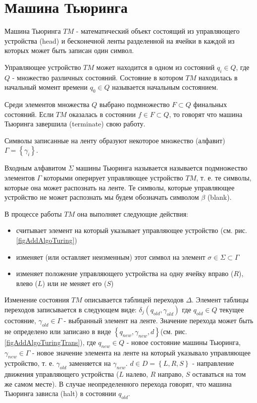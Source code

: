\section{Машина Тьюринга}
\label{addTuring}

Машина Тьюринга $TM$ - математический объект состоящий из
управляющего устройства (head) и бесконечной ленты разделенной на
ячейки в каждой из которых может быть записан один символ.



Управляющее устройство $TM$ может находится в одном из состояний $q_i
\in Q$, где $Q$ 
- множество различных состояний. Состояние в котором $TM$ находилась в
начальный момент времени $q_0 \in Q$ называется начальным состоянием. 

Среди элементов множества $Q$ выбрано подмножество $F \subset Q$
финальных состояний. Если $TM$ оказалась в состоянии $f \in F \subset
Q$, то говорят что машина Тьюринга завершила (terminate) свою работу.

Символы записанные на ленту образуют некоторое множество (алфавит)
$\Gamma = \left\{\gamma_i\right\}$.

Входным алфавитом $\Sigma$ машины Тьюринга называется называется
подмножество элементов $\Gamma$ которыми оперирует управляющее устройство $TM$,
т. е. те символы, которые она может распознать на ленте. Те символы,
которые управляющее устройство не может распознать мы будем обозначать символом
$\beta$ (blank).

В процессе работы $TM$ она выполняет следующие действия:
\begin{itemize}
\item{считывает элемент на который указывает управляющее устройство
  (см. рис. \ref{figAddAlgoTuring})}
\item{изменяет (или оставляет неизменным) этот символ на элемент
  $\sigma \in \Sigma \subset \Gamma$}
\item{изменяет положение управляющего устройства на одну ячейку вправо
  ($R$), влево ($L$) или не меняет его ($S$)}
\end{itemize}



Изменение состояния $TM$ описывается таблицей переходов
$\Delta$. Элемент таблицы переходов записывается в следующем виде: 
$\delta_j\left(q_{old}, \gamma_{old}\right)$ где $q_{old} \in Q$ текущее состояние,
$\gamma_{old} \in \Gamma$ - выбранный элемент на ленте. Значение
перехода может быть 
не определено или записано в виде $\left\{q_{new}, \gamma_{new},
d\right\}$(см. рис. \ref{figAddAlgoTuringTrans}), где
$q_{new} \in Q$ - новое состояние машины Тьюринга, $\gamma_{new} \in \Gamma$ -
новое значение элемента на ленте на который указывало управляющее устройство,
т. е. $\gamma_{old}$ заменяется на $\gamma_{new}$. $d \in D =
\left\{L, R, S\right\}$ - направление
движения управляющего устройства ($L$ налево, $R$ направо, $S$
оставаться на том же самом месте). В случае неопределенного
перехода говорят, что машина Тьюринга зависла (halt) в состоянии $q_{old}$.

